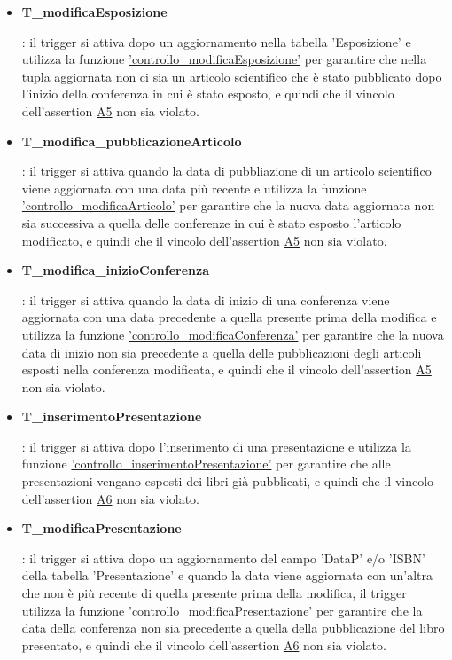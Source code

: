 \documentclass{article}
\begin{document}
\begin{itemize}
   \item \hypertarget{t12}{\textbf{T\_modificaEsposizione}}: il trigger si attiva dopo un aggiornamento nella tabella 'Esposizione' e utilizza la funzione \hyperlink{f12}{'controllo\_modificaEsposizione'} per garantire che nella tupla aggiornata non ci sia un articolo scientifico che è stato pubblicato dopo l'inizio della conferenza in cui è stato esposto, e quindi che il vincolo dell'assertion \hyperlink{assertion5}{A5} non sia violato.

   \item \hypertarget{t13}{\textbf{T\_modifica\_pubblicazioneArticolo}}: il trigger si attiva quando la data di pubbliazione di un articolo scientifico viene aggiornata con una data più recente e utilizza la funzione \hyperlink{f13}{'controllo\_modificaArticolo'} per garantire che la nuova data aggiornata non sia successiva a quella delle conferenze in cui è stato esposto l'articolo modificato, e quindi che il vincolo dell'assertion \hyperlink{assertion5}{A5} non sia violato.

   \item \hypertarget{t14}{\textbf{T\_modifica\_inizioConferenza}}: il trigger si attiva quando la data di inizio di una conferenza viene aggiornata con una data precedente a quella presente prima della modifica e utilizza la funzione \hyperlink{f14}{'controllo\_modificaConferenza'} per garantire che la nuova data di inizio non sia precedente a quella delle pubblicazioni degli articoli esposti nella conferenza modificata, e quindi che il vincolo dell'assertion \hyperlink{assertion5}{A5} non sia violato.

   \item \hypertarget{t15}{\textbf{T\_inserimentoPresentazione}}: il trigger si attiva dopo l'inserimento di una presentazione e utilizza la funzione \hyperlink{f15}{'controllo\_inserimentoPresentazione'} per garantire che alle presentazioni vengano esposti dei libri già pubblicati, e quindi che il vincolo dell'assertion \hyperlink{assertion6}{A6} non sia violato.

   \item \hypertarget{t16}{\textbf{T\_modificaPresentazione}}: il trigger si attiva dopo un aggiornamento del campo 'DataP' e/o 'ISBN' della tabella 'Presentazione' e quando la data viene aggiornata con un'altra che non è più recente di quella presente prima della modifica, il trigger utilizza la funzione \hyperlink{f16}{'controllo\_modificaPresentazione'} per garantire che la data della conferenza non sia precedente a quella della pubblicazione del libro presentato, e quindi che il vincolo dell'assertion \hyperlink{assertion6}{A6} non sia violato.


\end{itemize}
\end{document}

